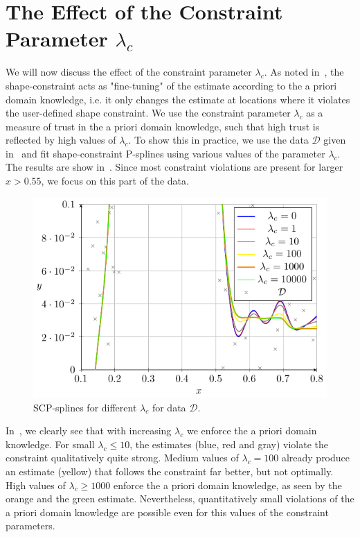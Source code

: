 \section{The Effect of the Constraint Parameter $\lambda_c$} \label{sec:lambda_c_sec}

We will now discuss the effect of the constraint parameter $\lambda_c$. As noted in~, the shape-constraint acts as "fine-tuning" of the estimate according to the a priori domain knowledge, i.e. it only changes the estimate at locations where it violates the user-defined shape constraint. We use the constraint parameter $\lambda_c$ as a measure of trust in the a priori domain knowledge, such that high trust is reflected by high values of $\lambda_c$. To show this in practice, we use the data $\mathcal{D}$ given in~ and fit shape-constraint P-splines using various values of the parameter $\lambda_c$. The results are show in~. Since most constraint violations are present for larger $x > 0.55$, we focus on this part of the data. 

\begin{figure}[H]
	\centering
	\includegraphics{graphics/pgfplots/cha4/exp-lambdas.pdf}
	\caption{SCP-splines for different $\lambda_c$ for data $\mathcal{D}$.}
	\label{fig:example-lambdas}
\end{figure}	

In~, we clearly see that with increasing $\lambda_c$ we enforce the a priori domain knowledge. For small $\lambda_c \le 10$, the estimates (blue, red and gray) violate the constraint qualitatively quite strong. Medium values of $\lambda_c = 100$ already produce an estimate (yellow) that follows the constraint far better, but not optimally. High values of $\lambda_c \ge 1000$ enforce the a priori domain knowledge, as seen by the orange and the green estimate. Nevertheless, quantitatively small violations of the a priori domain knowledge are possible even for this values of the constraint parameters. 
